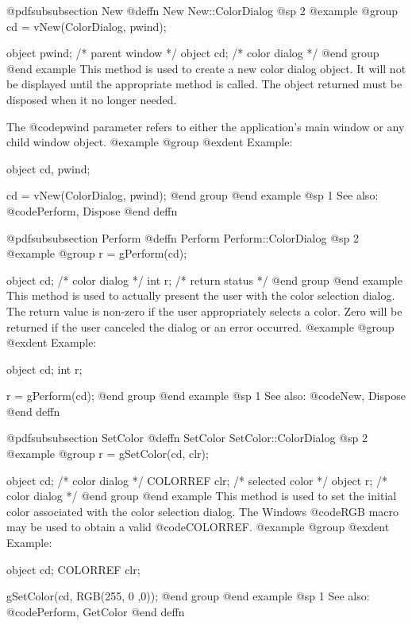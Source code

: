 @pdfsubsubsection {New}
@deffn {New} New::ColorDialog
@sp 2
@example
@group
cd = vNew(ColorDialog, pwind);

object  pwind;  /*  parent window  */
object  cd;     /*  color dialog   */
@end group
@end example
This method is used to create a new color dialog object.  It will not be
displayed until the appropriate method is called.  The object returned
must be disposed when it no longer needed.

The @code{pwind} parameter refers to either the application's main window
or any child window object.
@example
@group
@exdent Example:

object  cd, pwind;

cd = vNew(ColorDialog, pwind);
@end group
@end example
@sp 1
See also:  @code{Perform, Dispose}
@end deffn









@pdfsubsubsection {Perform}
@deffn {Perform} Perform::ColorDialog
@sp 2
@example
@group
r = gPerform(cd);

object  cd;     /*  color dialog   */
int     r;      /*  return status  */
@end group
@end example
This method is used to actually present the user with the color
selection dialog.  The return value is non-zero if the user appropriately
selects a color.  Zero will be returned if the user canceled the dialog
or an error occurred.
@example
@group
@exdent Example:

object  cd;
int     r;

r = gPerform(cd);
@end group
@end example
@sp 1
See also:  @code{New, Dispose}
@end deffn









@pdfsubsubsection {SetColor}
@deffn {SetColor} SetColor::ColorDialog
@sp 2
@example
@group
r = gSetColor(cd, clr);

object   cd;    /*  color dialog    */
COLORREF clr;   /*  selected color  */
object   r;     /*  color dialog    */
@end group
@end example
This method is used to set the initial color associated with the
color selection dialog.  The Windows @code{RGB} macro may be used
to obtain a valid @code{COLORREF}.
@example
@group
@exdent Example:

object  cd;
COLORREF clr;

gSetColor(cd, RGB(255, 0 ,0));
@end group
@end example
@sp 1
See also:  @code{Perform, GetColor}
@end deffn














